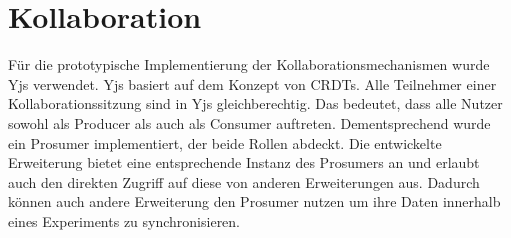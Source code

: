 \section{Kollaboration}\label{section:prototypische-implementierung:kollaboration}

Für die prototypische Implementierung der Kollaborationsmechanismen wurde Yjs \cite{noauthor_yjs_nodate} verwendet. Yjs basiert auf dem Konzept von \acp{CRDT}. Alle Teilnehmer einer Kollaborationssitzung sind in Yjs gleichberechtig. Das bedeutet, dass alle Nutzer sowohl als Producer als auch als Consumer auftreten. Dementsprechend wurde ein Prosumer implementiert, der beide Rollen abdeckt. Die entwickelte Erweiterung bietet eine entsprechende Instanz des Prosumers an und erlaubt auch den direkten Zugriff auf diese von anderen Erweiterungen aus. Dadurch können auch andere Erweiterung den Prosumer nutzen um ihre Daten innerhalb eines Experiments zu synchronisieren.